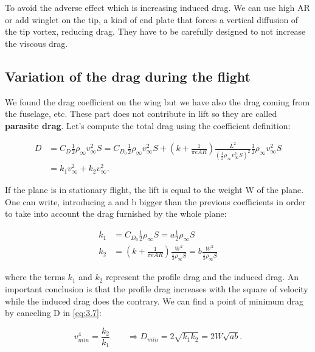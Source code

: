 	To avoid the adverse effect which is increasing induced drag. We can use high AR or add winglet on the tip, a kind of end plate that forces a vertical diffusion of the tip vortex, reducing drag. They have to be carefully designed to not increase the viscous drag. 
	
\subsection{Variation of the drag during the flight}
	We found the drag coefficient on the wing but we have also the drag coming from the fuselage, etc. These part does not contribute in lift so they  are called \textbf{parasite drag}. Let's compute the total drag using the coefficient definition:
	
	\begin{equation}
	\begin{aligned}
	D &= C_D \frac{1}{2} \rho _\infty v_\infty ^2 S = C_{D_0} \frac{1}{2} \rho _\infty v_\infty ^2 S + \left(k +\frac{1}{\pi e AR} \right)\frac{L^2}{( \frac{1}{2} \rho _\infty v_\infty ^2 S)^2} \frac{1}{2} \rho _\infty v_\infty ^2 S \\
	&= k_1 v_\infty ^2 + k_2 v_\infty^2.
	\end{aligned}
	\label{eq:3.7}
	\end{equation}
	
	If the plane is in stationary flight, the lift is equal to the weight W of the plane. One can write, introducing a and b bigger than the previous coefficients in order to take into account the drag furnished  by the whole plane:
	
	\begin{equation}
	\begin{aligned}
	k_1 &= C_{D_0} \frac{1}{2} \rho _\infty S = a \frac{1}{2} \rho _\infty S\\
	k_2 &= \left(k +\frac{1}{\pi e AR} \right)\frac{W^2}{\frac{1}{2} \rho _\infty  S}  = b \frac{W^2}{\frac{1}{2} \rho _\infty  S}
	\end{aligned}
	\end{equation}
	
	where the terms $k_1$ and $k_2$ represent the profile drag and the induced drag. An important conclusion is that the profile drag increases with the square of velocity while the induced drag does the contrary. We can find a point of minimum drag by canceling D in \eqref{eq:3.7}:
	
	\begin{equation}
	v_{min}^4 = \frac{k_2}{k_1} \qquad \Rightarrow D_{min} = 2\sqrt{k_1k_2} = 2W\sqrt{ab}.
	\end{equation}
	
